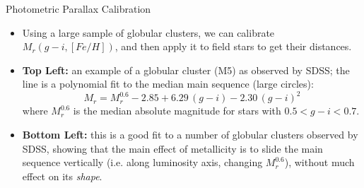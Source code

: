 \documentclass[letterpaper,landscape]{slides}
\begin{document}
\begin{slide}
{\begin{minipage}[t]{8cm}
\begin{center}
\end{center}
\end{minipage}

\begin{minipage}[t]{16cm}
\begin{center}
\vskip -1in
{\large \color{red} Photometric Parallax Calibration}
\end{center}


\begin{itemize}
\item {\color{blue} Using a large sample of globular clusters, we can calibrate 
      $M_r(g-i,[Fe/H])$, and then apply it to field stars to get their distances.}
\item {\bf Top Left:} an example of a globular cluster (M5) as observed by
       SDSS; the line is a polynomial fit to the median main sequence (large 
       circles):
\begin{equation}
       M_r = M_r^{0.6} -2.85 + 6.29 \, (g-i) -2.30 \, (g-i)^2  \nonumber
\end{equation}
where $M_r^{0.6}$ is the median absolute magnitude for stars 
with $0.5<g-i<0.7$. 
\item {\bf Bottom Left:} this is a good fit to a number of globular 
  clusters observed by SDSS, showing that the main effect of metallicity
  is to slide the main sequence vertically (i.e. along luminosity axis,
  changing $M_r^{0.6}$), without much effect on its {\it shape}.
\end{itemize}

\end{minipage}}
\vfill 
\end{slide}


\end{document}
